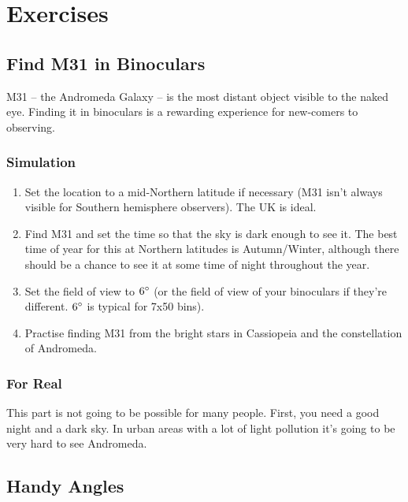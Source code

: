 
\chapter{Exercises}

\section{Find M31 in Binoculars}\label{find-m31-in-binoculars}

M31 -- the Andromeda Galaxy -- is the most distant object visible to the
naked eye. Finding it in binoculars is a rewarding experience for
new-comers to observing.

\subsection{Simulation}\label{simulation}

\begin{enumerate}
\item
  Set the location to a mid-Northern latitude if necessary (M31 isn't
  always visible for Southern hemisphere observers). The UK is ideal.
\item
  Find M31 and set the time so that the sky is dark enough to see it.
  The best time of year for this at Northern latitudes is Autumn/Winter,
  although there should be a chance to see it at some time of night
  throughout the year.
\item
  Set the field of view to $6\degree$ (or the field of view of your binoculars
  if they're different. $6\degree$ is typical for 7x50 bins).
\item
  Practise finding M31 from the bright stars in Cassiopeia and the
  constellation of Andromeda.
\end{enumerate}

\subsection{For Real}\label{for-real}

This part is not going to be possible for many people. First, you need a
good night and a dark sky. In urban areas with a lot of light pollution
it's going to be very hard to see Andromeda.

\section{Handy Angles}\label{handy-angles}

